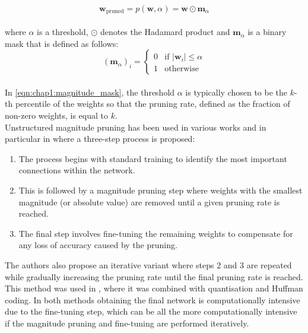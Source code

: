 \begin{equation}
  \label{eqn:chap1:magnitude_pruning}
  \mathbf{w}_{\text{pruned}} = p(\mathbf{w}, \alpha) = \mathbf{w} \odot \mathbf{m}_\alpha
\end{equation}\\

\noindent where $\alpha$ is a threshold, $\odot$ denotes the Hadamard product and
$\mathbf{m}_\alpha$ is a binary mask that is defined as follows:\\

\begin{equation}
  \label{eqn:chap1:magnitude_mask}
  (\mathbf{m}_\alpha)_i = \begin{cases}
  0 & \text{if } |\mathbf{w}_i| \leq \alpha \\
    1 & \text{otherwise}
  \end{cases}
\end{equation}\\

\noindent In \cref{eqn:chap1:magnitude_mask}, the threshold $\alpha$ is
typically chosen to be the $k$-th percentile of the weights so that the pruning
rate, defined as the fraction of non-zero weights, is equal to $k$.\\

Unstructured magnitude pruning has been used in various works and in particular
in \cite{DBLP:conf/nips/HanPTD15} where a three-step process is proposed:\\

\begin{enumerate}
  \item The process begins with standard training to identify the most important
  connections within the network.
  \item This is followed by a magnitude pruning step where weights with the
  smallest magnitude (or absolute value) are removed until a given pruning rate
  is reached.
  \item The final step involves fine-tuning the remaining weights to compensate
  for any loss of accuracy caused by the pruning.\\
\end{enumerate}

The authors also propose an iterative variant where steps 2 and 3 are
repeated while gradually increasing the pruning rate until the final pruning
rate is reached. This method was used in \cite{DBLP:journals/corr/HanMD15},
where it was combined with quantisation and Huffman coding. In both methods
\cite{DBLP:conf/nips/HanPTD15,DBLP:journals/corr/HanMD15} obtaining the final
network is computationally intensive due to the fine-tuning step, which can be
all the more computationally intensive if the magnitude pruning and fine-tuning
are performed iteratively. \\


